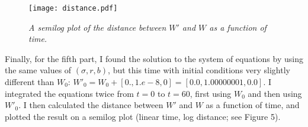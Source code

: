 \documentclass{article}
\begin{document}
\begin{figure}[h]
\caption{\textit{A semilog plot of the distance between $W'$ and $W$ as a function of time.}}
\centering
\texttt{[image: distance.pdf]}
\end{figure}

Finally, for the fifth part, I found the solution to the system of equations by using the same values of $(\sigma, r, b)$, but this time with initial conditions very slightly different than $W_0$: $W'_0 = W_0 + [0., 1.e-8, 0] = [0.0, 1.00000001, 0.0]$. I integrated the equations twice from $t = 0$ to $t = 60$, first using $W_0$ and then using $W'_0$. I then calculated the distance between $W'$ and $W$ as a function of time, and plotted the result on a semilog plot (linear time, log distance; see Figure 5). 
\end{document}
